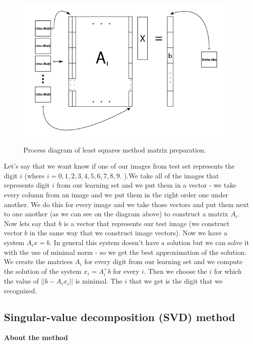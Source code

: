 \documentclass[12pt]{article}
\begin{document}
\begin{figure}[h]
	\centering
	\includegraphics[clip,scale=0.7]{images/squares.png}\underline{}
	\caption[Process diagram of least squares method matrix preparation]{Process diagram of least squares method matrix preparation.}
	
\end{figure}

\newpage
Let's say that we want know if one of our images from test set represents the digit $i$ (where $i = {0, 1, 2, 3, 4, 5, 6, 7, 8, 9.}$ ).We take all of the images that represents digit $i$ from our learning set and we put them in a vector - we take every column from an image and we put them in the right order one under another. We do this for every image and we take those vectors and put them next to one another (as we can see on the diagram above) to construct a matrix \textbf{$A_{i}$}.\\
Now lets say that $b$ is a vector that represents our test image (we construct vector $b$ in the same way that we construct image vectors). Now we have a system $A_{i}x = b$. In general this system doesn't have a solution but we can solve it with the use of minimal norm - so we get the best approximation of the solution. We create the matrices $A_{i}$ for every digit from our learning set and we compute the solution of the system $x_{i} = A^{+}_{i}b$ for every $i$. Then we choose the $i$ for which the value of $|| b - A_{i}x_{i} ||$ is minimal. The $i$ that we get is the digit that we recognized.

\newpage
\subsection{Singular-value decomposition (SVD) method}
\textbf{About the method}\\
\end{document}
